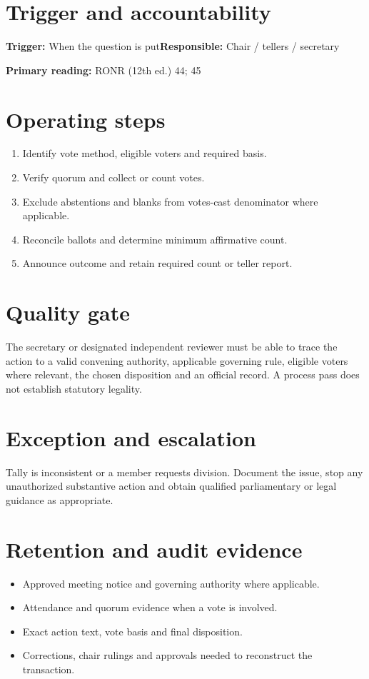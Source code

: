 \documentclass[11pt]{article}
\begin{document}
\SuiteOpen
{}
\section{Trigger and accountability}
\textbf{Trigger:} When the question is put\quad\textbf{Responsible:} Chair / tellers / secretary

\textbf{Primary reading:} RONR (12th ed.) 44; 45

\section{Operating steps}
\begin{enumerate}[leftmargin=*,itemsep=4pt]
\item Identify vote method, eligible voters and required basis.
\item Verify quorum and collect or count votes.
\item Exclude abstentions and blanks from votes-cast denominator where applicable.
\item Reconcile ballots and determine minimum affirmative count.
\item Announce outcome and retain required count or teller report.
\end{enumerate}

\section{Quality gate}
The secretary or designated independent reviewer must be able to trace the action to a valid convening authority, applicable governing rule, eligible voters where relevant, the chosen disposition and an official record. A process pass does not establish statutory legality.

\section{Exception and escalation}
Tally is inconsistent or a member requests division. Document the issue, stop any unauthorized substantive action and obtain qualified parliamentary or legal guidance as appropriate.

\section{Retention and audit evidence}
\begin{itemize}[leftmargin=*,itemsep=4pt]
\item Approved meeting notice and governing authority where applicable.
\item Attendance and quorum evidence when a vote is involved.
\item Exact action text, vote basis and final disposition.
\item Corrections, chair rulings and approvals needed to reconstruct the transaction.
\end{itemize}
\end{document}
